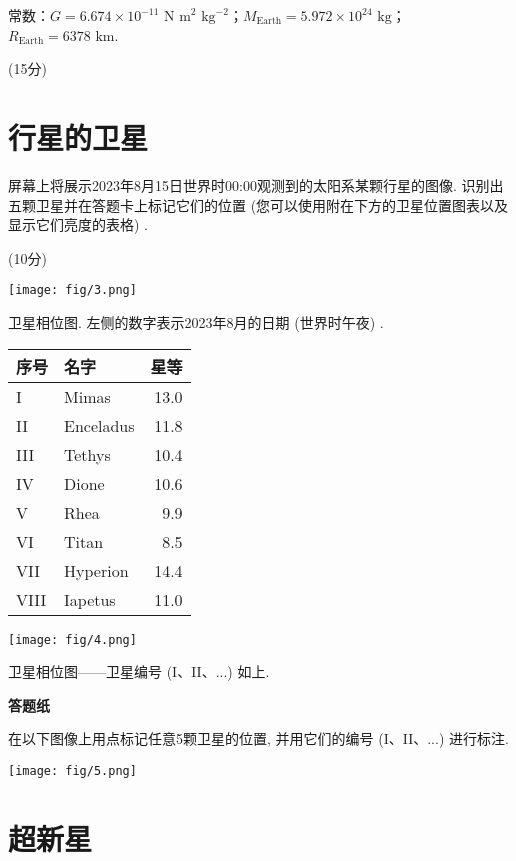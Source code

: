 \documentclass[a4paper,fontset=fandol]{ctexart}
\newcommand{\points}[1]{\par %
	\noindent %
	\hfill (#1分)%
	\vspace{1em}
	}
\begin{document}
	常数：$G=6.674\times10^{-11}\text{ N m}^2\text{ kg}^{-2}$；$M_\mathrm{Earth}=5.972\times10^{24}\text{ kg}$；$R_\mathrm{Earth}=6378\text{ km}$. 
	
	\points{15}
	
	\newpage
	\section{行星的卫星}
	
	屏幕上将展示2023年8月15日世界时00:00观测到的太阳系某颗行星的图像. 识别出五颗卫星并在答题卡上标记它们的位置 (您可以使用附在下方的卫星位置图表以及显示它们亮度的表格) . 
	\points{10}
	
	\vspace{0em}
	{\centering
		\texttt{[image: fig/3.png]}
		\begin{center}
			卫星相位图. 左侧的数字表示2023年8月的日期 (世界时午夜) . 
			\end{center}}
	
	\vspace{0em}
	\begin{table}[!h]
		\centering
		\begin{tabular}{llr}
			\toprule
			序号 & 名字 & 星等\\
			\midrule
			I&Mimas&13.0\\
			II & Enceladus & 11.8 \\
			III & Tethys & 10.4 \\
			IV & Dione & 10.6 \\
			V & Rhea & 9.9 \\
			VI & Titan & 8.5 \\
			VII & Hyperion & 14.4 \\
			VIII & Iapetus & 11.0 \\
			\bottomrule
		\end{tabular}
	\end{table}
	
	\newpage
	{
		\centering
		\texttt{[image: fig/4.png]}
		\begin{center}
			卫星相位图——卫星编号 (I、II、...) 如上. 
		\end{center}
	}
	
	\textbf{\Large 答题纸}
	
	在以下图像上用点标记任意5颗卫星的位置, 并用它们的编号 (I、II、...) 进行标注. 
	
	{\centering\texttt{[image: fig/5.png]}}
	
	\newpage
	\section{超新星}
	
\end{document}

